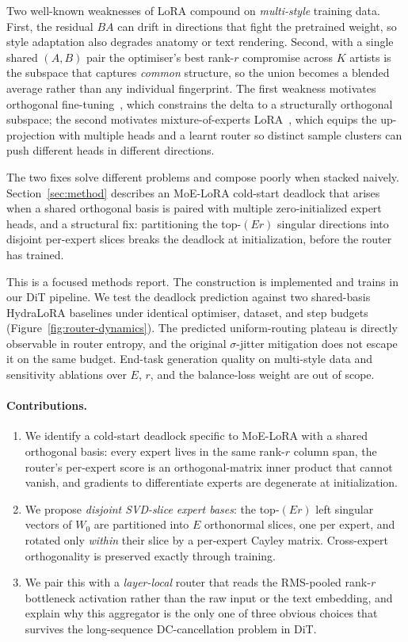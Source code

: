\documentclass[10pt]{article}
\begin{document}
Two well-known weaknesses of LoRA compound on \emph{multi-style}
training data. First, the residual $BA$ can drift in directions that
fight the pretrained weight, so style adaptation also degrades anatomy
or text rendering. Second, with a single shared $(A,B)$ pair the
optimiser's best rank-$r$ compromise across $K$ artists is the
subspace that captures \emph{common} structure, so the union becomes
a blended average rather than any individual fingerprint. The first
weakness motivates orthogonal fine-tuning~\cite{qiu2023oft,liu2024boft,
wu2026psoft}, which constrains the delta to a structurally orthogonal
subspace; the second motivates mixture-of-experts
LoRA~\cite{tian2024hydralora}, which equips the up-projection with
multiple heads and a learnt router so distinct sample clusters can
push different heads in different directions.

The two fixes solve different problems and compose poorly when stacked
naively. Section~\ref{sec:method} describes an MoE-LoRA cold-start
deadlock that arises when a shared orthogonal basis is paired with
multiple zero-initialized expert heads, and a structural fix:
partitioning the top-$(Er)$ singular directions into disjoint
per-expert slices breaks the deadlock at initialization, before the
router has trained.

This is a focused methods report. The construction is implemented and
trains in our DiT pipeline. We test the deadlock prediction against
two shared-basis HydraLoRA baselines under identical optimiser,
dataset, and step budgets (Figure~\ref{fig:router-dynamics}). The
predicted uniform-routing plateau is directly observable in router
entropy, and the original $\sigma$-jitter mitigation does not escape
it on the same budget. End-task generation quality on multi-style data
and sensitivity ablations over $E$, $r$, and the balance-loss weight
are out of scope.

\paragraph{Contributions.}
\begin{enumerate}[topsep=2pt,itemsep=0pt,leftmargin=1.2em]
\item We identify a cold-start deadlock specific to MoE-LoRA with a
shared orthogonal basis: every expert lives in the same rank-$r$
column span, the router's per-expert score is an orthogonal-matrix
inner product that cannot vanish, and gradients to differentiate
experts are degenerate at initialization.
\item We propose \emph{disjoint SVD-slice expert bases}: the
top-$(Er)$ left singular vectors of $W_0$ are partitioned into $E$
orthonormal slices, one per expert, and rotated only \emph{within}
their slice by a per-expert Cayley matrix. Cross-expert orthogonality
is preserved exactly through training.
\item We pair this with a \emph{layer-local} router that reads the
RMS-pooled rank-$r$ bottleneck activation rather than the raw input
or the text embedding, and explain why this aggregator is the only
one of three obvious choices that survives the long-sequence
DC-cancellation problem in DiT.
\end{enumerate}
\end{document}
